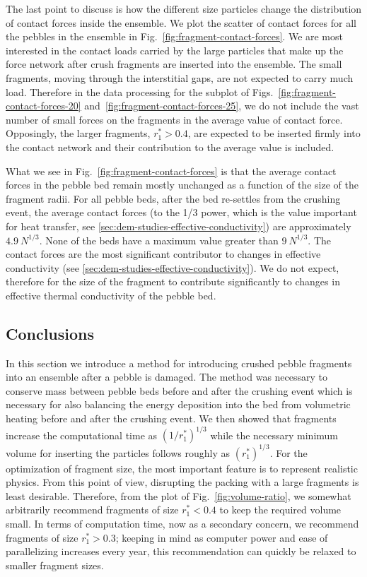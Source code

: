 \FloatBarrier

The last point to discuss is how the different size particles change the distribution of contact forces inside the ensemble. We plot the scatter of contact forces for all the pebbles in the ensemble in Fig.~\ref{fig:fragment-contact-forces}. We are most interested in the contact loads carried by the large particles that make up the force network after crush fragments are inserted into the ensemble. The small fragments, moving through the interstitial gaps, are not expected to carry much load. Therefore in the data processing for the subplot of Figs.~\ref{fig:fragment-contact-forces-20} and~\ref{fig:fragment-contact-forces-25}, we do not include the vast number of small forces on the fragments in the average value of contact force. Opposingly, the larger fragments, $r_1^* > 0.4$, are expected to be inserted firmly into the contact network and their contribution to the average value is included.

What we see in Fig.~\ref{fig:fragment-contact-forces} is that the average contact forces in the pebble bed remain mostly unchanged as a function of the size of the fragment radii. For all pebble beds, after the bed re-settles from the crushing event, the average contact forces (to the 1/3 power, which is the value important for heat transfer, see \cref{sec:dem-studies-effective-conductivity}) are approximately $4.9~N^{1/3}$. None of the beds have a maximum value greater than $9~N^{1/3}$. The contact forces are the most significant contributor to changes in effective conductivity (see \cref{sec:dem-studies-effective-conductivity}). We do not expect, therefore for the size of the fragment to contribute significantly to changes in effective thermal conductivity of the pebble bed.

\subsection{Conclusions}

In this section we introduce a method for introducing crushed pebble fragments into an ensemble after a pebble is damaged. The method was necessary to conserve mass between pebble beds before and after the crushing event which is necessary for also balancing the energy deposition into the bed from volumetric heating before and after the crushing event. We then showed that fragments increase the computational time as $(1/r_1^*)^{1/3}$ while the necessary minimum volume for inserting the particles follows roughly as $(r_1^*)^{1/3}$. For the optimization of fragment size, the most important feature is to represent realistic physics. From this point of view, disrupting the packing with a large fragments is least desirable. Therefore, from the plot of Fig.~\ref{fig:volume-ratio}, we somewhat arbitrarily recommend fragments of size $r_1^* < 0.4$ to keep the required volume small. In terms of computation time, now as a secondary concern, we recommend fragments of size $r_1^* > 0.3$; keeping in mind as computer power and ease of parallelizing increases every year, this recommendation can quickly be relaxed to smaller fragment sizes.

